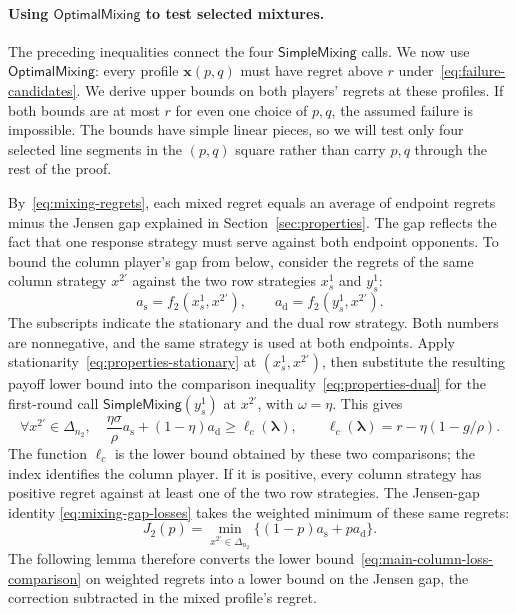 \documentclass[11pt]{article}
\theoremstyle{remark}
\theoremstyle{plain}
\newcommand{\sm}{\mathsf{SimpleMixing}}
\newcommand{\om}{\mathsf{OptimalMixing}}
\begin{document}
\paragraph{Using $\om$ to test selected mixtures.}
The preceding inequalities connect the four $\sm$ calls. We now
use $\om$: every profile $\boldsymbol x(p,q)$ must have regret above
$r$ under~\eqref{eq:failure-candidates}. We derive upper bounds on
both players' regrets at these profiles. If both bounds are at most
$r$ for even one choice of $p,q$, the assumed failure is impossible.
The bounds have simple linear pieces, so we will test only four
selected line segments in the $(p,q)$ square rather than carry $p,q$
through the rest of the proof.

By~\eqref{eq:mixing-regrets}, each mixed regret equals an average
of endpoint regrets minus the Jensen gap explained in
Section~\ref{sec:properties}. The gap reflects the fact that one
response strategy must serve against both endpoint opponents.
To bound the column player's gap from below,
consider the regrets of the same column strategy $x^{2\prime}$
against the two row strategies $x_s^1$ and $y_s^1$:
\begin{equation}
 a_{\mathrm s}=f_2(x_s^1,x^{2\prime}),\qquad
 a_{\mathrm d}=f_2(y_s^1,x^{2\prime}).
 \label{eq:main-column-payoff-losses}
\end{equation}
The subscripts indicate the stationary and the dual row strategy.
Both numbers are nonnegative, and the same strategy is used at both
endpoints. Apply stationarity~\eqref{eq:properties-stationary}
at $(x_s^1,x^{2\prime})$, then substitute the resulting payoff
lower bound into the comparison inequality~\eqref{eq:properties-dual}
for the first-round call $\sm(y_s^1)$ at $x^{2\prime}$, with
$\omega=\eta$. This gives
\begin{equation}
 \forall x^{2\prime}\in\Delta_{n_2},\quad
 \frac{\eta\sigma}{\rho}a_{\mathrm s}+(1-\eta)a_{\mathrm d}\ge\ell_c(\boldsymbol\lambda),
 \qquad \ell_c(\boldsymbol\lambda)=r-\eta(1-g/\rho).
 \label{eq:main-column-loss-comparison}
\end{equation}
The function $\ell_c$ is the lower bound obtained by these two
comparisons; the index identifies the column player.
If it is positive, every column strategy has positive regret against
at least one of the two row strategies. The Jensen-gap identity
\eqref{eq:mixing-gap-losses} takes the weighted minimum of these same
regrets:
\[
 J_2(p)=\min_{x^{2\prime}\in\Delta_{n_2}}\{(1-p)a_{\mathrm s}+pa_{\mathrm d}\}.
\]
The following lemma therefore converts the lower
bound~\eqref{eq:main-column-loss-comparison} on weighted regrets into
a lower bound on the Jensen gap, the correction subtracted in the
mixed profile's regret.
\end{document}
